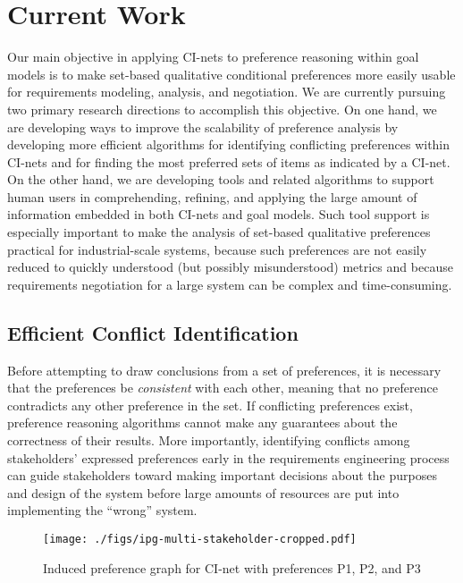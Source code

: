 \section{Current Work}
\label{sec:current-work}

Our main objective in applying CI-nets to preference reasoning within goal models is to make set-based qualitative conditional preferences more easily usable for requirements modeling, analysis, and negotiation. We are currently pursuing two primary research directions to accomplish this objective. On one hand, we are developing ways to improve the scalability of preference analysis by developing more efficient algorithms for identifying conflicting preferences within CI-nets and for finding the most preferred sets of items as indicated by a CI-net. On the other hand, we are developing tools and related algorithms to support human users in comprehending, refining, and applying the large amount of information embedded in both CI-nets and goal models. Such tool support is especially important to make the analysis of set-based qualitative preferences practical for industrial-scale systems, because such preferences are not easily reduced to quickly understood (but possibly misunderstood) metrics and because requirements negotiation for a large system can be complex and time-consuming.

\subsection{Efficient Conflict Identification}
\label{sec:conflict-id}

Before attempting to draw conclusions from a set of preferences, it is necessary that the preferences be \emph{consistent} with each other, meaning that no preference contradicts any other preference in the set. If conflicting preferences exist, preference reasoning algorithms cannot make any guarantees about the correctness of their results. More importantly, identifying conflicts among stakeholders' expressed preferences early in the requirements engineering process can guide stakeholders toward making important decisions about the purposes and design of the system before large amounts of resources are put into implementing the ``wrong'' system. 

\begin{figure}%
\centering
\texttt{[image: ./figs/ipg-multi-stakeholder-cropped.pdf]}%
\caption{Induced preference graph for CI-net with preferences P1, P2, and P3}%
\label{fig:ipg-with-conflict}%
\end{figure}

